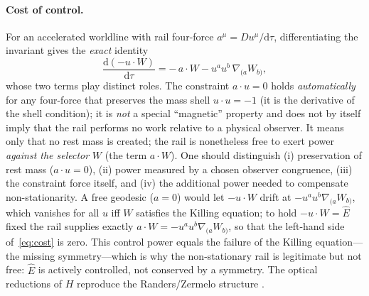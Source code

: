 \documentclass[12pt]{iopart}
\newcommand{\Ehat}{\hat E}
\newcommand{\dd}{\mathrm{d}}
\begin{document}
\paragraph{Cost of control.} For an accelerated worldline with rail four-force
$a^\mu=Du^\mu/\dd\tau$, differentiating the invariant gives the \emph{exact}
identity
\begin{equation}
    \frac{\dd(-u\cdot W)}{\dd\tau}=-\,a\cdot W-u^a u^b\,\nabla_{(a}W_{b)},
    \label{eq:cost}
\end{equation}
whose two terms play distinct roles. The constraint $a\cdot u=0$ holds
\emph{automatically} for any four-force that preserves the mass shell
$u\cdot u=-1$ (it is the derivative of the shell condition); it is \emph{not} a
special ``magnetic'' property and does not by itself imply that the rail performs no
work relative to a physical observer. It means only that no rest mass is created;
the rail is nonetheless free to exert power \emph{against the selector} $W$ (the term
$a\cdot W$). One should distinguish (i) preservation of rest mass ($a\cdot u=0$),
(ii) power measured by a chosen observer congruence, (iii) the constraint force
itself, and (iv) the additional power needed to compensate non-stationarity.
A free geodesic ($a=0$) would let $-u\cdot W$ drift at $-u^au^b\nabla_{(a}W_{b)}$,
which vanishes for all $u$ iff $W$ satisfies the Killing equation; to hold
$-u\cdot W=\Ehat$ fixed the rail supplies exactly $a\cdot W=-u^au^b\nabla_{(a}W_{b)}$,
so that the left-hand side of~\eqref{eq:cost} is zero. This control power equals the
failure of the Killing equation---the missing symmetry---which is why the
non-stationary rail is legitimate but not free: $\Ehat$ is actively controlled, not
conserved by a symmetry. The optical reductions of $H$
reproduce the Randers/Zermelo structure
\cite{GibbonsRanders2009,CaponioWind}.
\end{document}
